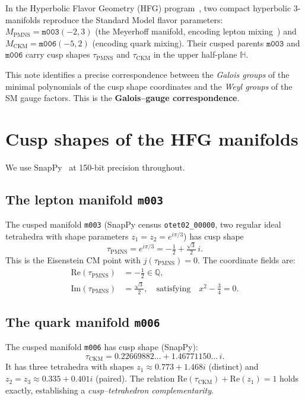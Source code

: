 \documentclass[11pt,a4paper]{article}
\theoremstyle{definition}
\theoremstyle{remark}
\newcommand{\mfld}[1]{\texttt{#1}}
\begin{document}
In the Hyperbolic Flavor Geometry (HFG) program~\cite{GentryUnified},
two compact hyperbolic 3-manifolds reproduce the Standard Model flavor
parameters: $M_{\mathrm{PMNS}}=\mfld{m003}(-2,3)$ (the Meyerhoff
manifold, encoding lepton mixing~\cite{GentryPMNS}) and
$M_{\mathrm{CKM}}=\mfld{m006}(-5,2)$ (encoding quark mixing).
Their cusped parents $\mfld{m003}$ and $\mfld{m006}$ carry cusp
shapes $\tau_{\mathrm{PMNS}}$ and $\tau_{\mathrm{CKM}}$ in the
upper half-plane $\mathbb{H}$.

This note identifies a precise correspondence between the
\emph{Galois groups} of the minimal polynomials of the cusp shape
coordinates and the \emph{Weyl groups} of the SM gauge factors.
This is the \textbf{Galois--gauge correspondence}.

\section{Cusp shapes of the HFG manifolds}
\label{sec:cusps}

We use SnapPy~\cite{SnapPy} at 150-bit precision throughout.

\subsection{The lepton manifold \mfld{m003}}

The cusped manifold \mfld{m003} (SnapPy census \texttt{otet02\_00000},
two regular ideal tetrahedra with shape parameters $z_1=z_2=e^{i\pi/3}$)
has cusp shape
\begin{equation}
\tau_{\mathrm{PMNS}} = e^{i\pi/3}
= -\tfrac12 + \tfrac{\sqrt3}{2}\,i.
\label{eq:tau_pmns}
\end{equation}
This is the Eisenstein CM point with $j(\tau_{\mathrm{PMNS}})=0$.
The coordinate fields are:
\begin{align}
\mathrm{Re}(\tau_{\mathrm{PMNS}}) &= -\tfrac12 \in\mathbb{Q},
\label{eq:re_pmns}\\
\mathrm{Im}(\tau_{\mathrm{PMNS}}) &= \tfrac{\sqrt3}{2},
\quad\text{satisfying}\quad x^2-\tfrac34=0.
\label{eq:im_pmns}
\end{align}

\subsection{The quark manifold \mfld{m006}}

The cusped manifold \mfld{m006} has cusp shape (SnapPy):
\begin{equation}
\tau_{\mathrm{CKM}}
= 0.22669882\ldots + 1.46771150\ldots\, i.
\label{eq:tau_ckm}
\end{equation}
It has three tetrahedra with shapes
$z_1\approx 0.773+1.468i$ (distinct)
and $z_2=z_3\approx 0.335+0.401i$ (paired).
The relation $\mathrm{Re}(\tau_{\mathrm{CKM}})+\mathrm{Re}(z_1)=1$
holds exactly, establishing a \emph{cusp--tetrahedron complementarity}.
\end{document}
